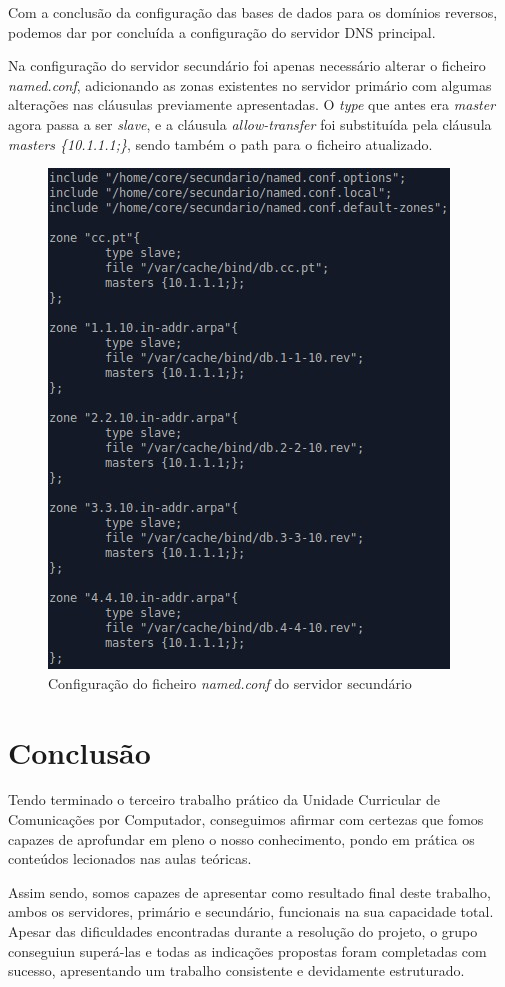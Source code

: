\documentclass[11pt]{article}
\begin{document}
\par Com a conclusão da configuração das bases de dados para os domínios reversos, podemos dar por concluída a configuração do servidor DNS principal.

\par Na configuração do servidor secundário foi apenas necessário alterar o ficheiro \textit{named.conf},
adicionando as zonas existentes no servidor primário com algumas alterações nas cláusulas previamente apresentadas. O \textit{type} que antes era \textit{master} agora passa a ser \textit{slave}, e a cláusula \textit{allow-transfer} foi substituída pela cláusula \textit{masters \{10.1.1.1;\}}, sendo também o path para o ficheiro atualizado.

\begin{figure}[H]
    \centering
    \includegraphics[width=.6\textwidth]{images/Parte2/2_sec.jpg}
    \caption{Configuração do ficheiro \textit{named.conf} do servidor secundário}
    \label{fig:namedsec}
\end{figure}


\clearpage
\section{Conclusão}

\par Tendo terminado o terceiro trabalho prático da Unidade Curricular de Comunicações por Computador, conseguimos afirmar com certezas que fomos capazes de aprofundar em pleno o nosso conhecimento, pondo em prática os conteúdos lecionados nas aulas teóricas.

\par Assim sendo, somos capazes de apresentar como resultado final deste trabalho, ambos os servidores, primário e secundário, funcionais na sua capacidade total. Apesar das dificuldades encontradas durante a resolução do projeto, o grupo conseguiun superá-las e todas as indicações propostas foram completadas com sucesso, apresentando um trabalho consistente e devidamente estruturado.
\end{document}
